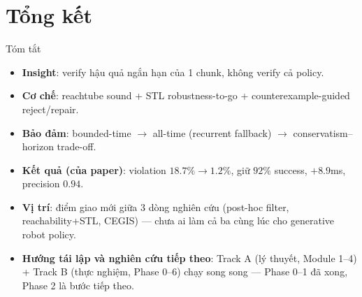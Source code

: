 \documentclass[aspectratio=169]{beamer}
\begin{document}
\section{Tổng kết}

\begin{frame}[t,shrink=8]{Tóm tắt}
\begin{itemize}
    \item \textbf{Insight}: verify hậu quả ngắn hạn của 1 chunk, không verify cả policy.
    \item \textbf{Cơ chế}: reachtube sound + STL robustness-to-go + counterexample-guided reject/repair.
    \item \textbf{Bảo đảm}: bounded-time $\to$ all-time (recurrent fallback) $\to$ conservatism--horizon trade-off.
    \item \textbf{Kết quả (của paper)}: violation $18.7\%\to1.2\%$, giữ $92\%$ success, $+8.9$ms, precision $0.94$.
    \item \textbf{Vị trí}: điểm giao mới giữa 3 dòng nghiên cứu (post-hoc filter, reachability+STL, CEGIS) --- chưa ai làm cả ba cùng lúc cho generative robot policy.
    \item \textbf{Hướng tái lập và nghiên cứu tiếp theo}: Track A (lý thuyết, Module 1--4) + Track B (thực nghiệm, Phase 0--6) chạy song song --- Phase 0--1 đã xong, Phase 2 là bước tiếp theo.
\end{itemize}
\end{frame}
\end{document}
